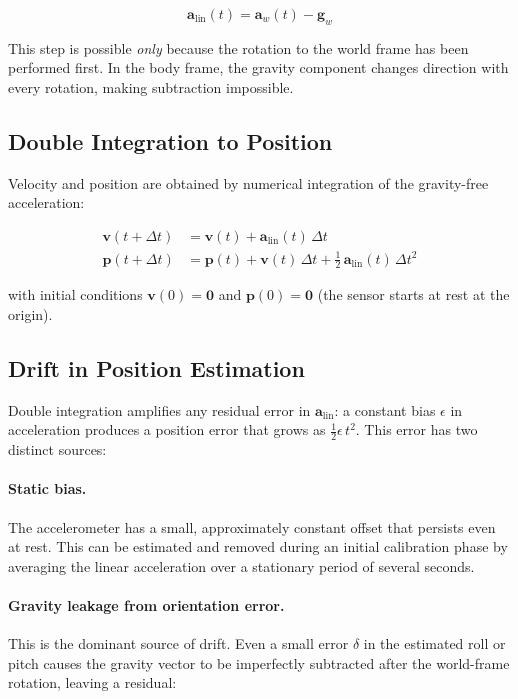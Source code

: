 \begin{equation}
  \mathbf{a}_\text{lin}(t) = \mathbf{a}_w(t) - \mathbf{g}_w
  \label{eq:gravity_removal}
\end{equation}

\noindent This step is possible \emph{only} because the rotation to the world
frame has been performed first. In the body frame, the gravity component
changes direction with every rotation, making subtraction impossible.

\subsection{Double Integration to Position}
\label{sec:proj:integration}

Velocity and position are obtained by numerical integration of the
gravity-free acceleration:

\begin{align}
  \mathbf{v}(t + \Delta t) &= \mathbf{v}(t)
    + \mathbf{a}_\text{lin}(t)\,\Delta t
  \label{eq:velocity} \\[4pt]
  \mathbf{p}(t + \Delta t) &= \mathbf{p}(t)
    + \mathbf{v}(t)\,\Delta t
    + \tfrac{1}{2}\,\mathbf{a}_\text{lin}(t)\,\Delta t^2
  \label{eq:position}
\end{align}

\noindent with initial conditions $\mathbf{v}(0) = \mathbf{0}$ and
$\mathbf{p}(0) = \mathbf{0}$ (the sensor starts at rest at the origin).

\subsection{Drift in Position Estimation}
\label{sec:proj:drift}

Double integration amplifies any residual error in
$\mathbf{a}_\text{lin}$: a constant bias $\epsilon$ in acceleration produces
a position error that grows as $\frac{1}{2}\epsilon\,t^2$. This error has two
distinct sources:

\paragraph{Static bias.}
The accelerometer has a small, approximately constant offset that persists
even at rest. This can be estimated and removed during an initial calibration
phase by averaging the linear acceleration over a stationary period of
several seconds.

\paragraph{Gravity leakage from orientation error.}
This is the dominant source of drift. Even a small error $\delta$ in the
estimated roll or pitch causes the gravity vector to be imperfectly
subtracted after the world-frame rotation, leaving a residual:

